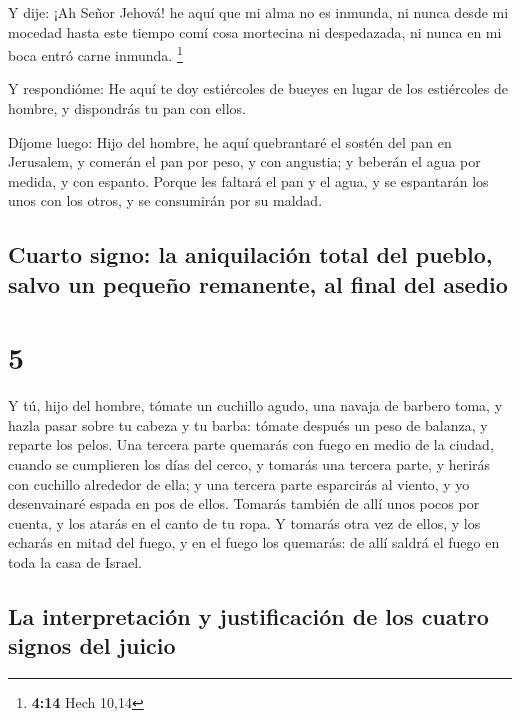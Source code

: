  Y dije: ¡Ah Señor Jehová! he aquí que mi alma no es
inmunda, ni nunca desde mi mocedad hasta este tiempo comí cosa mortecina
ni despedazada, ni nunca en mi boca entró carne inmunda. \footnote{\textbf{4:14}
  Hech 10,14}

 Y respondióme: He aquí te doy estiércoles de bueyes en
lugar de los estiércoles de hombre, y dispondrás tu pan con ellos.

 Díjome luego: Hijo del hombre, he aquí quebrantaré el
sostén del pan en Jerusalem, y comerán el pan por peso, y con angustia;
y beberán el agua por medida, y con espanto.  Porque les
faltará el pan y el agua, y se espantarán los unos con los otros, y se
consumirán por su maldad.

\hypertarget{cuarto-signo-la-aniquilaciuxf3n-total-del-pueblo-salvo-un-pequeuxf1o-remanente-al-final-del-asedio}{%
\subsection{Cuarto signo: la aniquilación total del pueblo, salvo un
pequeño remanente, al final del
asedio}\label{cuarto-signo-la-aniquilaciuxf3n-total-del-pueblo-salvo-un-pequeuxf1o-remanente-al-final-del-asedio}}

\hypertarget{section-4}{%
\section{5}\label{section-4}}

 Y tú, hijo del hombre, tómate un cuchillo agudo, una
navaja de barbero toma, y hazla pasar sobre tu cabeza y tu barba: tómate
después un peso de balanza, y reparte los pelos.  Una
tercera parte quemarás con fuego en medio de la ciudad, cuando se
cumplieren los días del cerco, y tomarás una tercera parte, y herirás
con cuchillo alrededor de ella; y una tercera parte esparcirás al
viento, y yo desenvainaré espada en pos de ellos.  Tomarás
también de allí unos pocos por cuenta, y los atarás en el canto de tu
ropa.  Y tomarás otra vez de ellos, y los echarás en mitad
del fuego, y en el fuego los quemarás: de allí saldrá el fuego en toda
la casa de Israel.

\hypertarget{la-interpretaciuxf3n-y-justificaciuxf3n-de-los-cuatro-signos-del-juicio}{%
\subsection{La interpretación y justificación de los cuatro signos del
juicio}\label{la-interpretaciuxf3n-y-justificaciuxf3n-de-los-cuatro-signos-del-juicio}}

